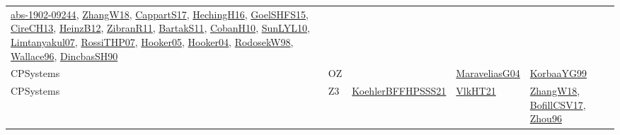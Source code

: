 {\begin{longtable}{lp{3cm}>{\raggedright}p{6cm}>{\raggedright}p{6cm}p{8cm}}
\href{articles/abs-1902-09244.pdf}{abs-1902-09244}\cite{abs-1902-09244}, \href{articles/ZhangW18.pdf}{ZhangW18}\cite{ZhangW18}, \href{papers/CappartS17.pdf}{CappartS17}\cite{CappartS17}, \href{papers/HechingH16.pdf}{HechingH16}\cite{HechingH16}, \href{articles/GoelSHFS15.pdf}{GoelSHFS15}\cite{GoelSHFS15}, \href{papers/CireCH13.pdf}{CireCH13}\cite{CireCH13}, \href{papers/HeinzB12.pdf}{HeinzB12}\cite{HeinzB12}, \href{papers/ZibranR11.pdf}{ZibranR11}\cite{ZibranR11}, \href{articles/BartakS11.pdf}{BartakS11}\cite{BartakS11}, \href{papers/CobanH10.pdf}{CobanH10}\cite{CobanH10}, \href{papers/SunLYL10.pdf}{SunLYL10}\cite{SunLYL10}, \href{papers/Limtanyakul07.pdf}{Limtanyakul07}\cite{Limtanyakul07}, \href{papers/RossiTHP07.pdf}{RossiTHP07}\cite{RossiTHP07}, \href{articles/Hooker05.pdf}{Hooker05}\cite{Hooker05}, \href{papers/Hooker04.pdf}{Hooker04}\cite{Hooker04}, \href{papers/RodosekW98.pdf}{RodosekW98}\cite{RodosekW98}, \href{articles/Wallace96.pdf}{Wallace96}\cite{Wallace96}, \href{articles/DincbasSH90.pdf}{DincbasSH90}\cite{DincbasSH90}\\
CPSystems & OZ &  & \href{papers/MaraveliasG04.pdf}{MaraveliasG04}\cite{MaraveliasG04} & \href{papers/KorbaaYG99.pdf}{KorbaaYG99}\cite{KorbaaYG99}\\
CPSystems & Z3 & \href{articles/KoehlerBFFHPSSS21.pdf}{KoehlerBFFHPSSS21}\cite{KoehlerBFFHPSSS21} & \href{articles/VlkHT21.pdf}{VlkHT21}\cite{VlkHT21} & \href{articles/ZhangW18.pdf}{ZhangW18}\cite{ZhangW18}, \href{papers/BofillCSV17.pdf}{BofillCSV17}\cite{BofillCSV17}, \href{papers/Zhou96.pdf}{Zhou96}\cite{Zhou96}\\

\end{longtable}}
